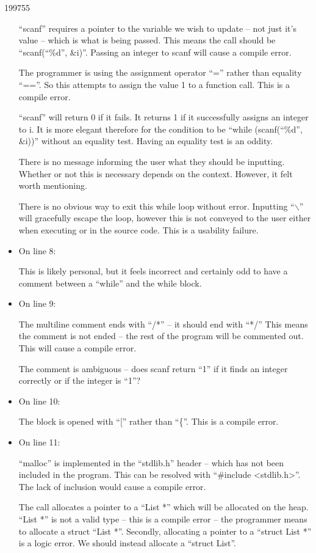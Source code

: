 \documentclass[10pt,\jkfside,a4paper]{article}
\begin{document}
\begin{examquestion}{1997}{5}{5}
\begin{itemize}
``scanf'' requires a pointer to the variable we wish to update -- not just
it's value -- which is what is being passed. This means the call should be
``scanf(``\%d'', \&i)''. Passing an integer to scanf will cause a compile
error.

The programmer is using the assignment operator ``='' rather than equality
``==''. So this attempts to assign the value 1 to a function call. This is a
compile error.

``scanf'' will return 0 if it fails. It returns 1 if it successfully
assigns an integer to i. It is more elegant therefore for the condition to
be ``while (scanf(``\%d'', \&i))'' without an equality test. Having an
equality test is an oddity.

There is no message informing the user what they should be inputting.
Whether or not this is necessary depends on the context. However, it felt
worth mentioning.

There is no obvious way to exit this while loop without error. Inputting
``$\backslash$'' will gracefully escape the loop, however this is not conveyed
to the user either when executing or in the source code. This is a usability
failure.

\item On line 8:

This is likely personal, but it feels incorrect and certainly odd to have a
comment between a ``while'' and the while block.

\item On line 9:

The multiline comment ends with ``/*'' -- it should end with ``*/'' This
means the comment is not ended -- the rest of the program will be commented
out. This will cause a compile error.

The comment is ambiguous -- does scanf return ``1'' if it finds an integer
correctly or if the integer is ``1''?

\item On line 10:

The block is opened with ``['' rather than ``\{''. This is a compile error.

\item On line 11:

``malloc'' is implemented in the ``stdlib.h'' header -- which has not been
included in the program. This can be resolved with ``\#include <stdlib.h>''.
The lack of inclusion would cause a compile error.

The call allocates a pointer to a ``List *'' which will be allocated on the
heap. ``List *'' is not a valid type -- this is a compile error -- the
programmer means to allocate a struct ``List *''. Secondly, allocating a
pointer to a ``struct List *'' is a logic error. We should instead allocate
a ``struct List''.


\end{itemize}
\end{examquestion}
\end{document}
